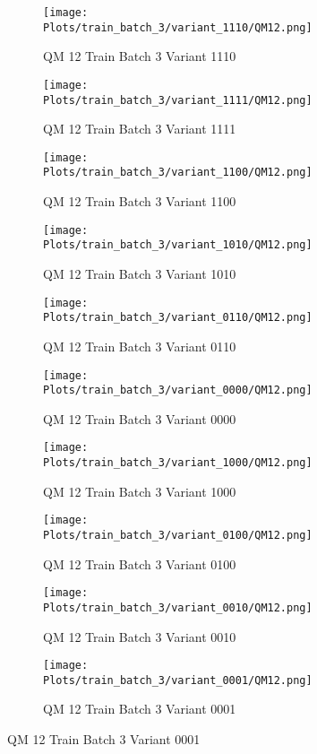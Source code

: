 \documentclass{DissertateFigs}
\begin{document}
\begin{figure}[t!]
    \begin{subfigure}{0.47\textwidth}
    \texttt{[image: Plots/train\_batch\_3/variant\_1110/QM12.png]}
    \caption{QM 12 Train Batch 3 Variant 1110}
    \end{subfigure}
    \begin{subfigure}{0.47\textwidth}
    \texttt{[image: Plots/train\_batch\_3/variant\_1111/QM12.png]}
    \caption{QM 12 Train Batch 3 Variant 1111}
    \end{subfigure}

\medskip

    \begin{subfigure}{0.47\textwidth}
    \texttt{[image: Plots/train\_batch\_3/variant\_1100/QM12.png]}
    \caption{QM 12 Train Batch 3 Variant 1100}
    \end{subfigure}
    \begin{subfigure}{0.47\textwidth}
    \texttt{[image: Plots/train\_batch\_3/variant\_1010/QM12.png]}
    \caption{QM 12 Train Batch 3 Variant 1010}
    \end{subfigure}

\medskip

    \begin{subfigure}{0.47\textwidth}
    \texttt{[image: Plots/train\_batch\_3/variant\_0110/QM12.png]}
    \caption{QM 12 Train Batch 3 Variant 0110}
    \end{subfigure}
    \begin{subfigure}{0.47\textwidth}
    \texttt{[image: Plots/train\_batch\_3/variant\_0000/QM12.png]}
    \caption{QM 12 Train Batch 3 Variant 0000}
    \end{subfigure}

\medskip

    \begin{subfigure}{0.47\textwidth}
    \texttt{[image: Plots/train\_batch\_3/variant\_1000/QM12.png]}
    \caption{QM 12 Train Batch 3 Variant 1000}
    \end{subfigure}
    \begin{subfigure}{0.47\textwidth}
    \texttt{[image: Plots/train\_batch\_3/variant\_0100/QM12.png]}
    \caption{QM 12 Train Batch 3 Variant 0100}
    \end{subfigure}

\medskip

    \begin{subfigure}{0.47\textwidth}
    \texttt{[image: Plots/train\_batch\_3/variant\_0010/QM12.png]}
    \caption{QM 12 Train Batch 3 Variant 0010}
    \end{subfigure}
    \begin{subfigure}{0.47\textwidth}
    \texttt{[image: Plots/train\_batch\_3/variant\_0001/QM12.png]}
    \caption{QM 12 Train Batch 3 Variant 0001}
    \end{subfigure}


\end{figure}
\end{document}
